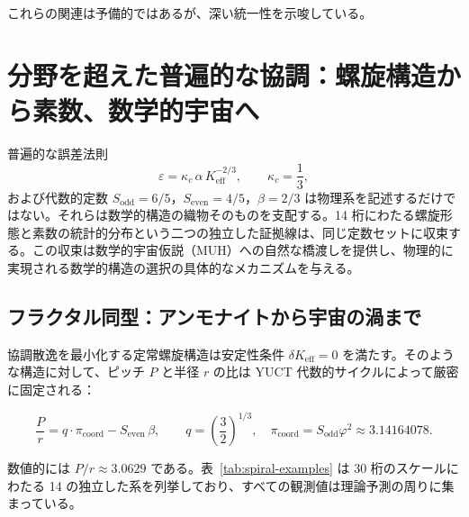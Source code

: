 \documentclass[11pt,a4paper]{article}
\newcommand{\Keff}{K_{\mathrm{eff}}}
\newcommand{\eps}{\varepsilon}
\newcommand{\kappac}{\kappa_c}
\begin{document}
	これらの関連は予備的ではあるが、深い統一性を示唆している。
	
	\section{分野を超えた普遍的な協調：螺旋構造から素数、数学的宇宙へ}
	\label{sec:universal}
	
	普遍的な誤差法則
	\begin{equation}
		\eps = \kappac\,\alpha\,\Keff^{-2/3}, \qquad \kappac = \frac{1}{3},
		\label{eq:errorlaw}
	\end{equation}
	および代数的定数 \(S_{\mathrm{odd}}=6/5\)，\(S_{\mathrm{even}}=4/5\)，\(\beta=2/3\) は物理系を記述するだけではない。それらは数学的構造の織物そのものを支配する。14 桁にわたる螺旋形態と素数の統計的分布という二つの独立した証拠線は、同じ定数セットに収束する。この収束は数学的宇宙仮説（MUH）への自然な橋渡しを提供し、物理的に実現される数学的構造の選択の具体的なメカニズムを与える。
	
	\subsection{フラクタル同型：アンモナイトから宇宙の渦まで}
	
	協調散逸を最小化する定常螺旋構造は安定性条件 \(\delta K_{\mathrm{eff}} = 0\) を満たす。そのような構造に対して、ピッチ \(P\) と半径 \(r\) の比は YUCT 代数的サイクルによって厳密に固定される：
	
	\begin{equation}
		\boxed{ \frac{P}{r} = q \cdot \pi_{\mathrm{coord}} - S_{\mathrm{even}} \, \beta }, \qquad
		q = \left(\frac{3}{2}\right)^{1/3},\quad
		\pi_{\mathrm{coord}} = S_{\mathrm{odd}} \varphi^2 \approx 3.14164078.
		\label{eq:spiral-universal}
	\end{equation}
	
	数値的には \(P/r \approx 3.0629\) である。表~\ref{tab:spiral-examples} は 30 桁のスケールにわたる 14 の独立した系を列挙しており、すべての観測値は理論予測の周りに集まっている。
	
\end{document}
